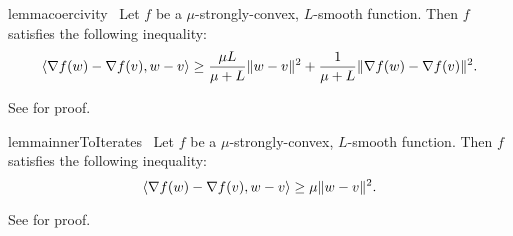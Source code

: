 \begin{restatable}{lemma}{coercivity}~\label{lemma:coercivity}
    Let \( f \) be a \( \mu  \)-strongly-convex, \( L  \)-smooth function. 
    Then \( f \) satisfies the following inequality:
    \[ \left\langle\nabla f(w) - \nabla f(v), w - v\right\rangle \geq \frac{\mu L}{\mu + L}\|w - v\|^2 + \frac{1}{\mu + L} \|\nabla f(w) - \nabla f(v)\|^2.  \] 
\end{restatable}
\noindent See \citet[Lemma 3.11]{bubeck2015convex} for proof.

\begin{restatable}{lemma}{innerToIterates}~\label{lemma:inner-to-iterates}
    Let \( f \) be a \( \mu  \)-strongly-convex, \( L  \)-smooth function. 
    Then \( f \) satisfies the following inequality:
    \[ \left\langle\nabla f(w) - \nabla f(v), w - v\right\rangle \geq \mu\|w - v\|^2. \]
\end{restatable}
\noindent See \citet[Theorem 2.1.9]{nesterov2004lectures} for proof.
